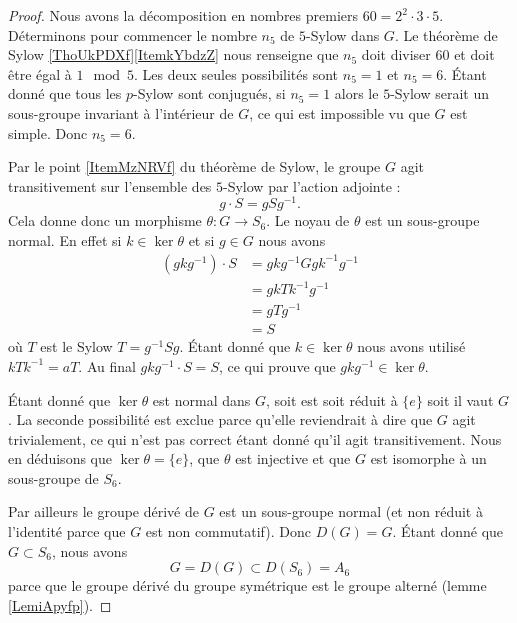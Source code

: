 \begin{proof}
    Nous avons la décomposition en nombres premiers \( 60=2^2\cdot 3\cdot 5\). Déterminons pour commencer le nombre \( n_5\) de \( 5\)-Sylow dans \( G\). Le théorème de Sylow \ref{ThoUkPDXf}\ref{ItemkYbdzZ} nous renseigne que \( n_5\) doit diviser \( 60\) et doit être égal à \( 1\mod 5\). Les deux seules possibilités sont \( n_5=1\) et \( n_5=6\). Étant donné que tous les \( p\)-Sylow sont conjugués, si \( n_5=1\) alors le \( 5\)-Sylow serait un sous-groupe invariant à l'intérieur de $G$, ce qui est impossible vu que \( G\) est simple. Donc \( n_5=6\).

    Par le point \ref{ItemMzNRVf} du théorème de Sylow, le groupe \( G\) agit transitivement sur l'ensemble des \( 5\)-Sylow par l'action adjointe :
    \begin{equation}
        g\cdot S=gSg^{-1}.
    \end{equation}
    Cela donne donc un morphisme \( \theta\colon G\to S_6\). Le noyau de \( \theta\) est un sous-groupe normal. En effet si \( k\in \ker\theta\) et si \( g\in G\) nous avons
    \begin{subequations}
        \begin{align}
            (gkg^{-1})\cdot S&=gkg^{-1} Ggk^{-1}g^{-1}\\
            &=gkTk^{-1}g^{-1}\\
            &=gTg^{-1}\\
            &=S
        \end{align}
    \end{subequations}
    où \( T\) est le Sylow \( T=g^{-1}Sg\). Étant donné que \( k\in \ker\theta\) nous avons utilisé \( kTk^{-1}=aT\). Au final \( gkg^{-1}\cdot S=S\), ce qui prouve que \( gkg^{-1} \in\ker\theta\).

    Étant donné que \( \ker\theta\) est normal dans \( G\), soit est soit réduit à \( \{ e \}\) soit il vaut \( G\). La seconde possibilité est exclue parce qu'elle reviendrait à dire que \( G\) agit trivialement, ce qui n'est pas correct étant donné qu'il agit transitivement. Nous en déduisons que \( \ker\theta=\{ e \}\), que \( \theta\) est injective et que \( G\) est isomorphe à un sous-groupe de \( S_6\).

    Par ailleurs le groupe dérivé de \( G\) est un sous-groupe normal (et non réduit à l'identité parce que \( G\) est non commutatif). Donc \( D(G)=G\). Étant donné que \( G\subset S_6\), nous avons
    \begin{equation}
        G=D(G)\subset D(S_6)=A_6
    \end{equation}
    parce que le groupe dérivé du groupe symétrique est le groupe alterné (lemme \ref{LemiApyfp}).


\end{proof}
